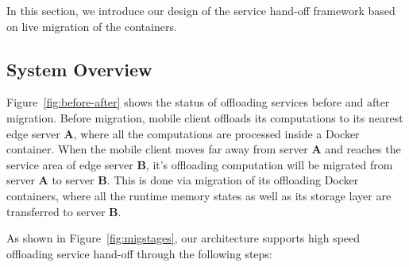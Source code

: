 
In this section, we introduce our design of the  service hand-off framework based on live migration of the containers. 

\subsection{System Overview}




Figure~\ref{fig:before-after} shows the status of offloading services before and after migration. Before migration, mobile client offloads its computations to its nearest edge server \textbf{A}, where all the computations are processed inside a Docker container. When the mobile client moves far away from server \textbf{A} and reaches the service area of edge server \textbf{B}, it's offloading computation will be migrated from server \textbf{A} to server \textbf{B}. This is done via migration of its offloading Docker containers, where all the runtime memory states as well as its storage layer are transferred to server \textbf{B}.





As shown in Figure~\ref{fig:migstages},
our architecture supports high speed offloading service hand-off through the following steps:

